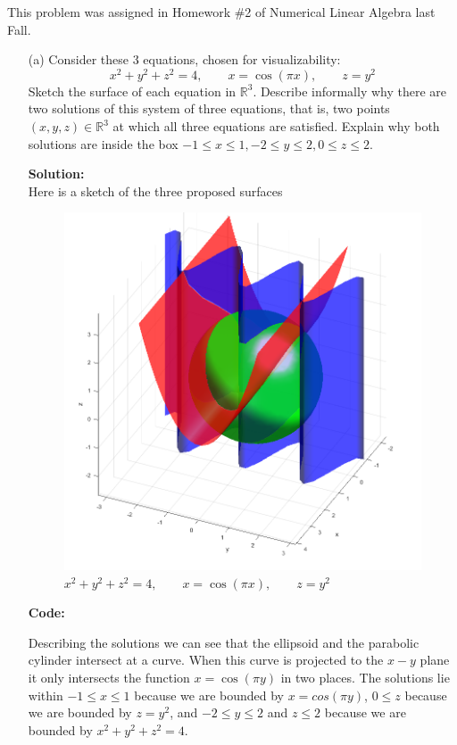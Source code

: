 \documentclass[12pt]{article}
\makeatletter
\theoremstyle{homework}
\newenvironment{exercise}[1]
{\def\@currentlabel{#1}\exercisecore}
{\endexercisecore}
\newcommand{\localhead}[1]{\par\smallskip\noindent\textbf{#1}\nobreak\\}%
\newcommand\solution{\localhead{Solution:}}
\newcommand{\Reals}{\ensuremath{\mathbb R}}
\let\RR\Reals
\makeatother
\begin{document}
\begin{exercise}{Problem P17} This problem was assigned in Homework \#2 of Numerical Linear Algebra last Fall. 
  \begin{enumerate}
    \item[(a)] Consider these 3 equations, chosen for visualizability:
    \begin{equation*}
      x^2 + y^2 + z^2 = 4, \qquad x = \cos(\pi x), \qquad z = y^2
    \end{equation*}
    Sketch the surface of each equation in $\RR^3$. Describe informally why there are 
    two solutions of this system of three equations, that is, two points $(x, y, z) \in \RR^3$
    at which all three equations are satisfied. Explain why both solutions are inside the box $-1 \leq x \leq 1, -2 \leq y \leq 2, 0 \leq z \leq 2$.
    \solution Here is a sketch of the three proposed surfaces
    \begin{figure}[H]
      \begin{center}
        \caption{  $x^2 + y^2 + z^2 = 4, \qquad x = \cos(\pi x), \qquad z = y^2$ }
        \includegraphics[width=.75\textwidth]{fig2.png}
      \end{center}
    \end{figure}

    \textbf{Code:}
    \begin{center}
      
    \end{center}

    Describing the solutions we can see that the ellipsoid and the parabolic cylinder intersect at a curve.
    When this curve is projected to the $x-y$ plane it only intersects the function $x = \cos(\pi y)$ in two places. The solutions lie within $-1\leq x \leq 1$ because we are bounded by $x = cos(\pi y)$,
    $0\leq z$ because we are bounded by $z = y^2$, and $-2\leq y \leq 2$ and $z \leq 2$ because we are bounded by $x^2 + y^2 + z^2 = 4$.



\end{enumerate}
\end{exercise}
\end{document}
